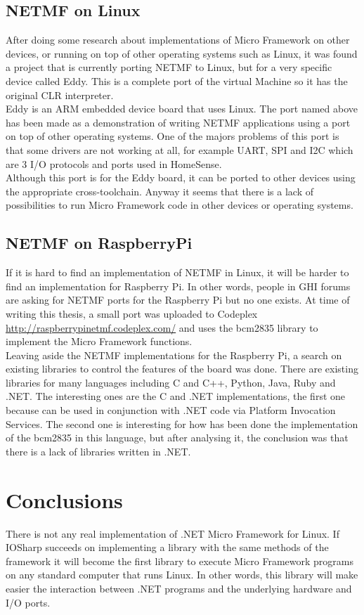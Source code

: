 \subsection{NETMF on Linux}\label{SS:SOTA-NETMF-Linux}
After doing some research about implementations of Micro Framework on other devices, or running on top of other operating systems such as Linux, it was found a project that is currently porting NETMF to Linux, but for a very specific device called Eddy. This is a complete port of the virtual Machine so it has the original CLR interpreter.
\\
Eddy is an ARM embedded device board that uses Linux. The port named above has been made as a demonstration of writing NETMF applications using a port on top of other operating systems. One of the majors problems of this port is that some drivers are not working at all, for example UART, SPI and \gls{I2C} which are 3 I/O protocols and ports used in HomeSense.
\\
Although this port is for the Eddy board, it can be ported to other devices using the appropriate cross-toolchain. Anyway it seems that there is a lack of possibilities to run Micro Framework code in other devices or operating systems.

\subsection{NETMF on RaspberryPi}\label{SS:SOTA-NETMF-RPI}
If it is hard to find an implementation of NETMF in Linux, it will be harder to find an implementation for Raspberry Pi. In other words, people in GHI forums are asking for NETMF ports for the Raspberry Pi but no one exists. At time of writing this thesis, a small port was uploaded to Codeplex \url{http://raspberrypinetmf.codeplex.com/} and uses the bcm2835 library to implement the Micro Framework functions.
\\
Leaving aside the NETMF implementations for the Raspberry Pi, a search on existing libraries to control the features of the board was done. There are existing libraries for many languages including C and C++, Python, Java, Ruby and .NET. The interesting ones are the C and .NET implementations, the first one because can be used in conjunction with .NET code via Platform Invocation Services. The second one is interesting for how has been done the implementation of the bcm2835 in this language, but after analysing it, the conclusion was that there is a lack of libraries written in .NET.

\section{Conclusions}\label{S:SOTA-Conclusions}
There is not any real implementation of .NET Micro Framework for Linux. If IOSharp succeeds on implementing a library with the same methods of the framework it will become the first library to execute Micro Framework programs on any standard computer that runs Linux. In other words, this library will make easier the interaction between .NET programs and the underlying hardware and I/O ports.